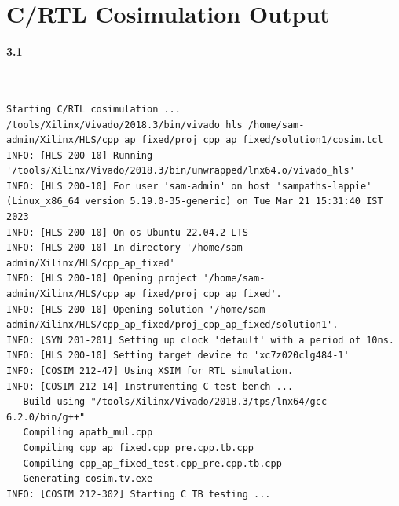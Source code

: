 \documentclass{article}
\begin{document}
\section{C/RTL Cosimulation Output}
\vspace{1cm}
\textbf{3.1}
\begin{lstlisting}


Starting C/RTL cosimulation ...
/tools/Xilinx/Vivado/2018.3/bin/vivado_hls /home/sam-admin/Xilinx/HLS/cpp_ap_fixed/proj_cpp_ap_fixed/solution1/cosim.tcl
INFO: [HLS 200-10] Running '/tools/Xilinx/Vivado/2018.3/bin/unwrapped/lnx64.o/vivado_hls'
INFO: [HLS 200-10] For user 'sam-admin' on host 'sampaths-lappie' (Linux_x86_64 version 5.19.0-35-generic) on Tue Mar 21 15:31:40 IST 2023
INFO: [HLS 200-10] On os Ubuntu 22.04.2 LTS
INFO: [HLS 200-10] In directory '/home/sam-admin/Xilinx/HLS/cpp_ap_fixed'
INFO: [HLS 200-10] Opening project '/home/sam-admin/Xilinx/HLS/cpp_ap_fixed/proj_cpp_ap_fixed'.
INFO: [HLS 200-10] Opening solution '/home/sam-admin/Xilinx/HLS/cpp_ap_fixed/proj_cpp_ap_fixed/solution1'.
INFO: [SYN 201-201] Setting up clock 'default' with a period of 10ns.
INFO: [HLS 200-10] Setting target device to 'xc7z020clg484-1'
INFO: [COSIM 212-47] Using XSIM for RTL simulation.
INFO: [COSIM 212-14] Instrumenting C test bench ...
   Build using "/tools/Xilinx/Vivado/2018.3/tps/lnx64/gcc-6.2.0/bin/g++"
   Compiling apatb_mul.cpp
   Compiling cpp_ap_fixed.cpp_pre.cpp.tb.cpp
   Compiling cpp_ap_fixed_test.cpp_pre.cpp.tb.cpp
   Generating cosim.tv.exe
INFO: [COSIM 212-302] Starting C TB testing ... 



\end{lstlisting}
\end{document}
